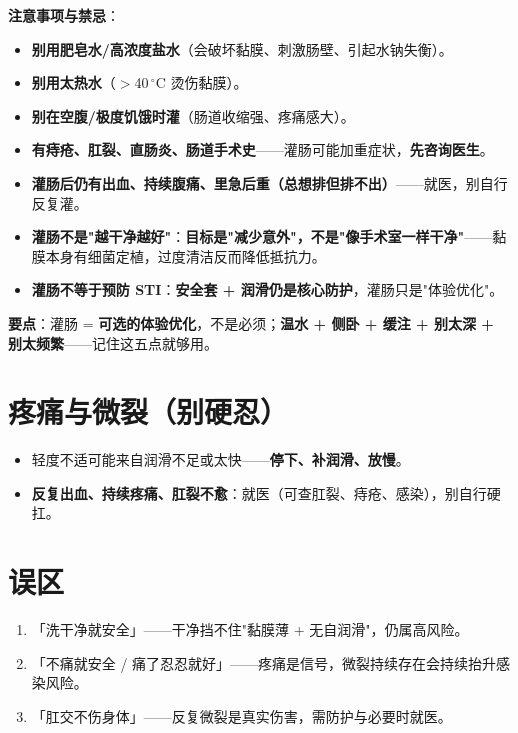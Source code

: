 \documentclass[12pt,UTF8,openany]{ctexbook}
\begin{document}
\noindent\textbf{注意事项与禁忌}：
\begin{itemize}[leftmargin=2em,itemsep=0.3em]
  \item \textbf{别用肥皂水/高浓度盐水}（会破坏黏膜、刺激肠壁、引起水钠失衡）。
  \item \textbf{别用太热水}（$>$40\,$^\circ$C 烫伤黏膜）。
  \item \textbf{别在空腹/极度饥饿时灌}（肠道收缩强、疼痛感大）。
  \item \textbf{有痔疮、肛裂、直肠炎、肠道手术史}——灌肠可能加重症状，\textbf{先咨询医生}。
  \item \textbf{灌肠后仍有出血、持续腹痛、里急后重（总想排但排不出）}——就医，别自行反复灌。
  \item \textbf{灌肠不是"越干净越好"}：\textbf{目标是"减少意外"，不是"像手术室一样干净"}——黏膜本身有细菌定植，过度清洁反而降低抵抗力。
  \item \textbf{灌肠不等于预防 STI}：\textbf{安全套 + 润滑仍是核心防护}，灌肠只是"体验优化"。
\end{itemize}

\noindent\textbf{要点}：灌肠 = \textbf{可选的体验优化}，不是必须；\textbf{温水 + 侧卧 + 缓注 + 别太深 + 别太频繁}——记住这五点就够用。

\section{疼痛与微裂（别硬忍）}

\begin{itemize}[leftmargin=2em,itemsep=0.3em]
  \item 轻度不适可能来自润滑不足或太快——\textbf{停下、补润滑、放慢}。
  \item \textbf{反复出血、持续疼痛、肛裂不愈}：就医（可查肛裂、痔疮、感染），别自行硬扛。
\end{itemize}

\section{误区}

\begin{enumerate}[leftmargin=2em,itemsep=0.3em]
  \item 「洗干净就安全」——干净挡不住"黏膜薄 + 无自润滑"，仍属高风险。
  \item 「不痛就安全 / 痛了忍忍就好」——疼痛是信号，微裂持续存在会持续抬升感染风险。
  \item 「肛交不伤身体」——反复微裂是真实伤害，需防护与必要时就医。
\end{enumerate}
\end{document}
